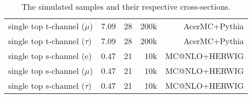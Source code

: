 \begin{table}[htdp]
\begin{center}
\begin{tabular}{lrrrr}
single top t-channel ($\mu$)  &  7.09 & 28   & 200k  & AcerMC+Pythia   \\[1mm]
single top t-channel ($\tau$) &  7.09 & 28   & 200k  & AcerMC+Pythia   \\[1mm]
\hline
single top s-channel (e)      &  0.47 &  21  & 10k    & MC@NLO+HERWIG  \\[1mm]
single top s-channel ($\mu$)  &  0.47 &  21  & 10k   & MC@NLO+HERWIG  \\[1mm]
single top s-channel ($\tau$) &  0.47 &  21  & 10k   & MC@NLO+HERWIG  \\[1mm]
\hline\hline
\end{tabular}
\caption{The simulated samples and their respective cross-sections.}
\label{TABLE-BACKGROUND-MCSAMPLES1}
\end{center}
\end{table}

